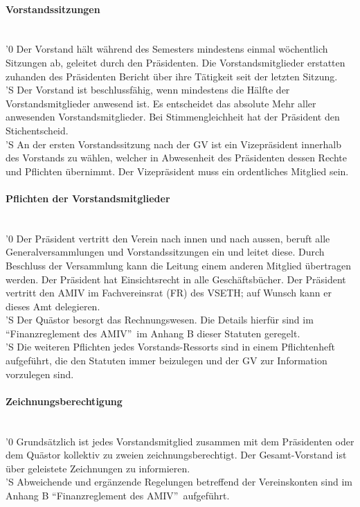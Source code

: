 \documentclass[a4paper,11pt]{article}
\newcommand{\nl}{\\[1.5ex]}
\begin{document}
\paragraph{Vorstandssitzungen} \ \\
'0 Der Vorstand hält während des Semesters mindestens einmal wöchentlich Sitzungen ab, geleitet durch den Präsidenten. Die Vorstandsmitglieder erstatten zuhanden des Präsidenten Bericht über ihre Tätigkeit seit der letzten Sitzung.\nl
'S Der Vorstand ist beschlussfähig, wenn mindestens die Hälfte der Vorstandsmitglieder anwesend ist. Es entscheidet das absolute Mehr aller anwesenden Vorstandsmitglieder. Bei Stimmengleichheit hat der Präsident den Stichentscheid.\nl
'S An der ersten Vorstandssitzung nach der GV ist ein Vizepräsident innerhalb des Vorstands zu wählen, welcher in Abwesenheit des Präsidenten dessen Rechte und Pflichten übernimmt. Der Vizepräsident muss ein ordentliches Mitglied sein.


\paragraph{Pflichten der Vorstandsmitglieder} \ \\
'0 Der Präsident vertritt den Verein nach innen und nach aussen, beruft alle Generalversammlungen und Vorstandssitzungen ein und leitet diese. Durch Beschluss der Versammlung kann die Leitung einem anderen Mitglied übertragen werden. Der Präsident hat Einsichtsrecht in alle Geschäftsbücher. Der Präsident vertritt den AMIV im Fachvereinsrat (FR) des VSETH; auf Wunsch kann er dieses Amt delegieren.\nl
'S Der Quästor besorgt das Rechnungswesen. Die Details hierfür sind im ``Finanzreglement des AMIV''\ im Anhang B dieser Statuten geregelt.\nl
'S Die weiteren Pflichten jedes Vorstands-Ressorts sind in einem Pflichtenheft aufgeführt, die den Statuten immer beizulegen und der GV zur Information vorzulegen sind.


\paragraph{Zeichnungsberechtigung} \ \\
'0 Grundsätzlich ist jedes Vorstandsmitglied zusammen mit dem Präsidenten oder dem Quästor kollektiv zu zweien zeichnungsberechtigt. Der Gesamt-Vorstand ist über geleistete Zeichnungen zu informieren.\nl
'S Abweichende und ergänzende Regelungen betreffend der Vereinskonten sind im Anhang B ``Finanzreglement des AMIV''\ aufgeführt.
\end{document}
